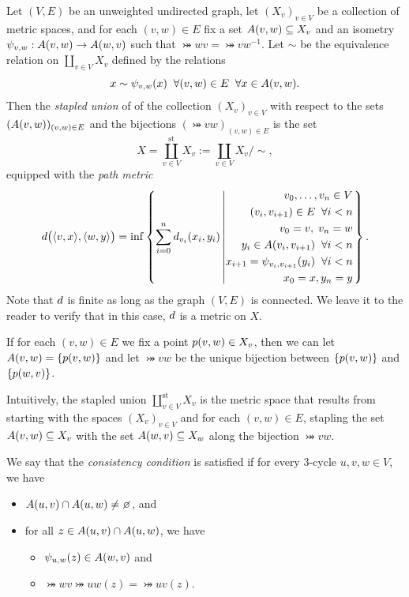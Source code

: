 \begin{definition}
\label{definitionstapledunion}
Let $(V,E)$ be an unweighted undirected graph, let $(X_v)_{v\in V}$ be a collection of metric spaces, and for each $(v,w)\in E$ fix a set $A(v,w)\subseteq X_v$ and an isometry $\psi_{v,w}:A(v,w)\to A(w,v)$ such that $\bij wv = \bij vw^{-1}$. Let $\sim$ be the equivalence relation on $\coprod_{v\in V} X_v$ defined by the relations
\[
x\sim \psi_{v,w}(x) \;\;\forall (v,w)\in E \;\;\forall x\in A(v,w).
\]
Then the \emph{stapled union} of of the collection $(X_v)_{v\in V}$ with respect to the sets $(A(v,w))_{(v,w)\in E}$ and the bijections $(\bij vw)_{(v,w)\in E}$ is the set 
\[
X =  \coprod_{v\in V}^{\text{st}} X_v := \coprod_{v\in V} X_v / \sim,
\] 
equipped with the \emph{path metric}
\begin{equation}
\label{pathmetricv3}
d\big(\langle v,x\rangle,\langle w,y\rangle\big) = \inf\left\{\sum_{i = 0}^n d_{v_i}(x_i,y_i) \left\vert
\begin{split}
v_0,\ldots,v_n\in V\\
(v_i,v_{i + 1}) \in E \;\;\forall i < n\\
v_0 = v, \; v_n = w\\
y_i\in A(v_i,v_{i + 1}) \;\;\forall i < n\\
x_{i + 1} = \psi_{v_i,v_{i + 1}}(y_i) \;\;\forall i < n\\
x_0 = x, y_n = y
\end{split}
\right.\right\}.
\end{equation}
Note that $d$ is finite as long as the graph $(V,E)$ is connected. We leave it to the reader to verify that in this case, $d$ is a metric on $X$.
\end{definition}

\begin{example}
If for each $(v,w)\in E$ we fix a point $p(v,w)\in X_v$, then we can let $A(v,w) = \{p(v,w)\}$ and let $\bij vw$ be the unique bijection between $\{p(v,w)\}$ and $\{p(w,v)\}$.
\end{example}

Intuitively, the stapled union $\coprod_{v\in V}^{\text{st}} X_v$ is the metric space that results from starting with the spaces $(X_v)_{v\in V}$ and for each $(v,w)\in E$, stapling the set $A(v,w)\subseteq X_v$ with the set $A(w,v)\subseteq X_w$ along the bijection $\bij vw$.

\begin{definition}
\label{definitionconsistency}
We say that the \emph{consistency condition} is satisfied if for every $3$-cycle $u,v,w\in V$, we have
\begin{itemize}
\item[(I)] $\set uv\cap \set uw \neq \emptyset$, and
\item[(II)] for all $z\in A(u,v)\cap A(u,w)$, we have
\begin{itemize}
\item[(a)] $\psi_{u,w}(z)\in A(w,v)$ and
\item[(b)] $\bij wv\bij uw(z) = \bij uv(z)$.
\end{itemize}
\end{itemize}
\end{definition}




